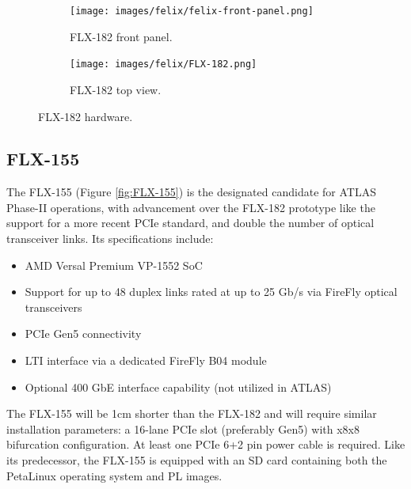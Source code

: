 \begin{figure}[H]
\centering
\begin{subfigure}[b]{0.48\textwidth}
    \centering
    \texttt{[image: images/felix/felix-front-panel.png]}
    \caption{FLX-182 front panel.}
    \label{fig:FLX-182-panel}
\end{subfigure}
\hfill
\begin{subfigure}[b]{0.48\textwidth}
    \centering
    \texttt{[image: images/felix/FLX-182.png]}
    \caption{FLX-182 top view.}
    \label{fig:FLX-182}
\end{subfigure}
\caption{FLX-182 hardware.}
\label{fig:FLX-182-combined}
\end{figure}

\subsection{FLX-155}
\label{subsec:FLX-155}
The FLX-155 (Figure \ref{fig:FLX-155}) is the designated candidate for \acs{ATLAS} Phase-II operations, with advancement over the FLX-182 prototype like the support for a more recent \acs{PCIe} standard, and double the number of optical transceiver links. Its specifications include:

\begin{itemize}
    \item AMD Versal Premium VP-1552 SoC
    \item Support for up to 48 duplex links rated at up to 25 Gb/s via FireFly optical transceivers
    \item \acs{PCIe} Gen5 connectivity
    \item \acs{LTI} interface via a dedicated FireFly B04 module
    \item Optional 400 GbE interface capability (not utilized in ATLAS)
\end{itemize}

The FLX-155 will be 1cm shorter than the FLX-182 and will require similar installation parameters: a 16-lane \acs{PCIe} slot (preferably Gen5) with x8x8 bifurcation configuration. At least one \acs{PCIe} 6+2 pin power cable is required. Like its predecessor, the FLX-155 is equipped with an SD card containing both the PetaLinux operating system and \acl{PL} images.

